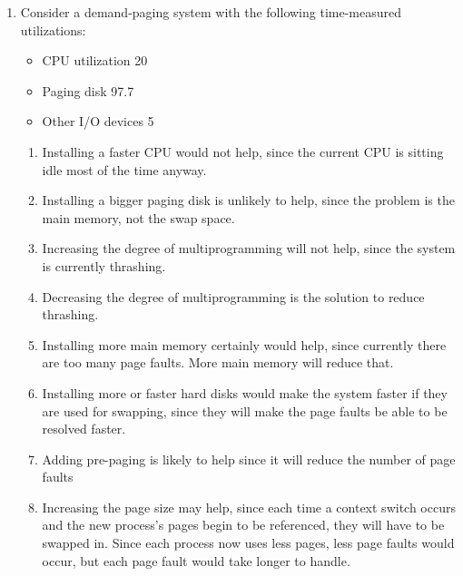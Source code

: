 \documentclass[fleqn]{article}
\newenvironment{answers}{ %
	\begin{enumerate}
		\setlength{\itemsep}{\bigskipamount}
}{	\end{enumerate}	}
\begin{document}
\begin{answers}
	\item  %
	Consider a demand-paging system with the following time-measured utilizations:
	\begin{itemize}
		\item CPU utilization 20%
		\item Paging disk 97.7%
		\item Other I/O devices 5%
	\end{itemize}

	\begin{enumerate}
		\item Installing a faster CPU would not help, since the current CPU is sitting idle most of the time anyway.
		\item Installing a bigger paging disk is unlikely to help, since the problem is the main memory, not the swap space.
		\item Increasing the degree of multiprogramming will not help, since the system is currently thrashing.
		\item Decreasing the degree of multiprogramming is the solution to reduce thrashing.
		\item Installing more main memory certainly would help, since currently there are too many page faults. More main memory will reduce that.
		\item Installing more or faster hard disks would make the system faster if they are used for swapping, since they will make the page faults be able to be resolved faster.
		\item Adding pre-paging is likely to help since it will reduce the number of page faults
		\item Increasing the page size may help, since each time a context switch occurs and the new process's pages begin to be referenced, they will have to be swapped in. Since each process now uses less pages, less page faults would occur, but each page fault would take longer to handle.
	\end{enumerate}
\end{answers}
\end{document}
